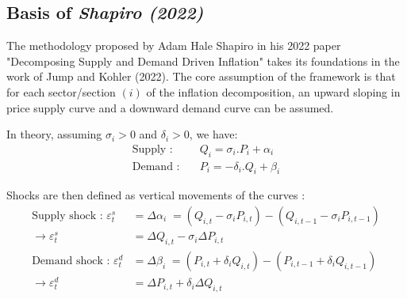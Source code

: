 \subsection{Basis of \textit{Shapiro (2022)}}

\quad The methodology proposed by Adam Hale Shapiro in his 2022 paper "Decomposing Supply and Demand Driven Inflation" takes its foundations in the work of Jump and Kohler (2022).
The core assumption of the framework is that for each sector/section $(i)$ of the inflation decomposition, an upward sloping in price supply curve and a downward demand curve can be assumed.

\begin{center}
\end{center}

\noindent In theory, assuming $\sigma_{i}>0$ and $\delta_{i}>0$, we have:
\begin{align*}
    \textrm{Supply :} & \quad Q_{i} = \sigma_{i}.P_{i} + \alpha_{i}\\
    \textrm{Demand :} & \quad P_{i} = -\delta_{i}.Q_{i} + \beta_{i}
\end{align*}

\noindent Shocks are then defined as vertical movements of the curves :
\begin{align*}
    \textrm{Supply shock : } \varepsilon_{t}^{s} &= \Delta \alpha_{i} \; = (Q_{i,t} - \sigma_{i}P_{i,t}) - (Q_{i,t-1} - \sigma_{i}P_{i,t-1})\\
    \rightarrow \varepsilon_{t}^{s} &= \Delta Q_{i,t} - \sigma_{i}\Delta P_{i,t}\\
    \textrm{Demand shock : } \varepsilon_{t}^{d} &= \Delta \beta_{i} \; = (P_{i,t} + \delta_{i}Q_{i,t}) - (P_{i,t-1} + \delta_{i}Q_{i,t-1})\\
    \rightarrow \varepsilon_{t}^{d} &= \Delta P_{i,t} + \delta_{i}\Delta Q_{i,t}
\end{align*}

